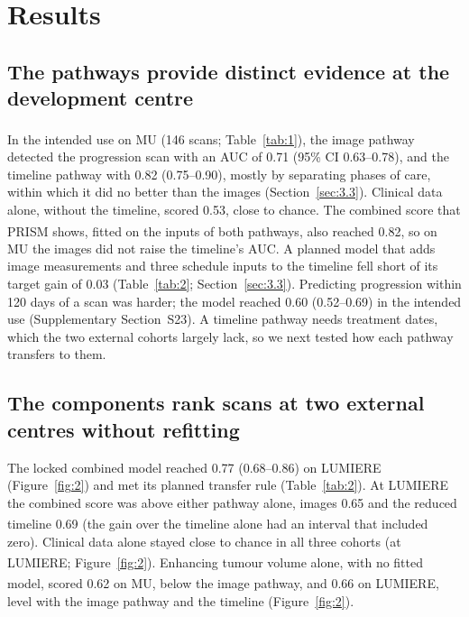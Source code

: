 \documentclass[largeformat]{interact} %
\newcommand{\expl}{\textsuperscript{\textdagger}}
\begin{document}
\section{Results}\label{sec:3}



\subsection{The pathways provide distinct evidence at the development centre}\label{sec:3.1}

In the intended use on MU (146 scans; Table~\ref{tab:1}), the image pathway\expl{} detected the progression scan
with an AUC of 0.71 (95\% CI 0.63--0.78), and the timeline pathway with 0.82 (0.75--0.90), mostly by separating
phases of care, within which it did no better than the images (Section~\ref{sec:3.3}). Clinical data alone, without
the timeline, scored 0.53, close to chance. The combined score that PRISM shows, fitted on the inputs of both
pathways\expl, also reached 0.82, so on MU the images did not raise the timeline's AUC. A planned model that adds image measurements and three schedule inputs to the timeline fell short of its target gain
of 0.03 (Table~\ref{tab:2}; Section~\ref{sec:3.3}). Predicting progression within 120 days of a scan was harder;
the model reached 0.60 (0.52--0.69) in the intended use (Supplementary Section~S23). A timeline pathway needs treatment dates, which the two
external cohorts largely lack, so we next tested how each pathway transfers to them.

\subsection{The components rank scans at two external centres without refitting}\label{sec:3.2}

The locked combined model reached 0.77 (0.68--0.86) on LUMIERE (Figure~\ref{fig:2}) and met its planned transfer
rule (Table~\ref{tab:2}). At LUMIERE the combined score was above either pathway alone, images 0.65 and the reduced
timeline 0.69\expl{} (the gain over the timeline alone had an interval that included zero). Clinical data alone
stayed close to chance in all three cohorts (at LUMIERE\expl; Figure~\ref{fig:2}). Enhancing tumour volume alone, with no fitted
model\expl, scored 0.62 on MU, below the image pathway, and 0.66 on LUMIERE, level with the image pathway and the timeline (Figure~\ref{fig:2}).
\end{document}
